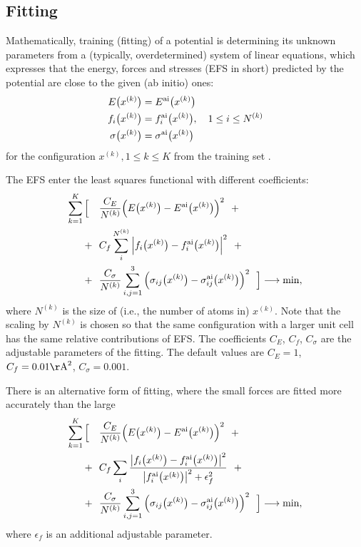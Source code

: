 \documentclass[12pt]{article}
\newcommand{\ai}{{\rm ai}}
\renewcommand{\_}{\char`_}
\newcommand{\eps}{{\epsilon}}
\begin{document}
\subsection{Fitting}

Mathematically, training (fitting) of a potential is determining its unknown parameters from a (typically, overdetermined) system of linear equations, which expresses that the energy, forces and stresses (EFS in short) predicted by the potential are close to the given (ab initio) ones:
\begin{align*}
E\big(x^{(k)}\big) &= E^\ai\big(x^{(k)}\big)
\\
f_i\big(x^{(k)}\big) &= f_i^\ai\big(x^{(k)}\big), \quad {1\leq i\leq N^{(k)}}
\\
\sigma\big(x^{(k)}\big) &= \sigma^\ai\big(x^{(k)}\big)
\end{align*}
for the configuration $x^{(k)}, {1\leq k \leq K}$ from the training set \cite{Shapeev2016-MTP, ActiveLearning}.

The EFS enter the least squares functional with different coefficients:
\begin{equation}
\label{eq:fit}
\begin{split}
\sum_{k=1}^K\Big[~~~&\frac{C_E}{N^{(k)}} \Big(E\big(x^{(k)}\big)-E^\ai\big(x^{(k)}\big)\Big)^2 ~~+\\
+~~&C_f \sum_i^{N^{(k)}} \Big|f_i\big(x^{(k)}\big)-f_i^\ai\big(x^{(k)}\big)\Big|^2 ~~+ \\
+~~&\frac{C_\sigma}{N^{(k)}} \sum_{i,j=1}^3  \Big(\sigma_{ij}\big(x^{(k)}\big)-\sigma^\ai_{ij}\big(x^{(k)}\big)\Big)^2 ~~ \Big] \longrightarrow \min,\\
\end{split}
\end{equation}
where $N^{(k)}$ is the size of (i.e., the number of atoms in) $x^{(k)}$.
Note that the scaling by $N^{(k)}$ is chosen so that the same configuration with a larger unit cell has the same relative contributions of EFS.
The coefficients $C_E$, $C_f$, $C_\sigma$ are the adjustable parameters of the fitting.
The default values are $C_E = 1$, $C_f = 0.01 {\rm \AA}^2$, $C_\sigma = 0.001$.

\medskip
There is an alternative form of fitting, where the small forces are fitted more accurately than the large 
\begin{equation}
\label{eq:fitrel}
\begin{split}
\sum_{k=1}^K\Big[~~~&\frac{C_E}{N^{(k)}} \Big(E\big(x^{(k)}\big)-E^\ai\big(x^{(k)}\big)\Big)^2 ~~+\\
+~~&C_f \sum_i \frac{\big|f_i\big(x^{(k)}\big)-f_i^\ai\big(x^{(k)}\big)\big|^2}{\big|f_i^\ai\big(x^{(k)}\big)\big|^2+\eps_f^2}~~+ \\
+~~&\frac{C_\sigma}{N^{(k)}} \sum_{i,j=1}^3  \Big(\sigma_{ij}\big(x^{(k)}\big)-\sigma^\ai_{ij}\big(x^{(k)}\big)\Big)^2 ~~ \Big] \longrightarrow \min,\\
\end{split}
\end{equation}
where $\eps_f$ is an additional adjustable parameter.
\end{document}
